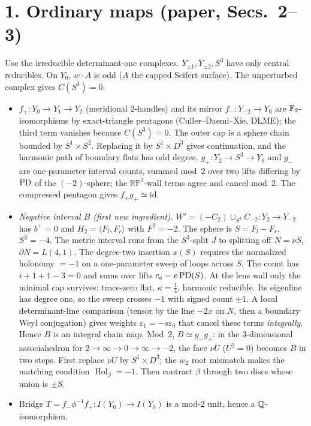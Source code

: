 \documentclass[10pt]{amsart}
\newcommand{\Hol}{\operatorname{Hol}}
\begin{document}
\section*{1. Ordinary maps (paper, Secs.~2--3)}
Use the irreducible determinant-one complexes. $Y_{\pm1},Y_{\pm2},S^3$ have
only central reducibles. On $Y_0$, $w\cdot A$ is odd ($A$ the capped Seifert
surface). The unperturbed complex gives $C(S^3)=0$.
\begin{itemize}
\item $f_+\colon Y_0\to Y_1\to Y_2$ (meridional $2$-handles) and its mirror
$f_-\colon Y_{-2}\to Y_0$ are $\mathbb F_2$-isomorphisms by exact-triangle
pentagons (Culler--Daemi--Xie, DLME); the third term vanishes because
$C(S^3)=0$. The outer cap is a sphere chain bounded by $S^1\times S^2$.
Replacing it by $S^1\times D^3$ gives continuation, and the harmonic path of
boundary flats has odd degree.
$g_+\colon Y_2\to S^3\to Y_0$ and $g_-$ are one-parameter interval counts,
summed mod~$2$ over two lifts differing by $\operatorname{PD}$ of the $(-2)$-sphere; the
$\mathbb{RP}^3$-wall terms agree and cancel mod~$2$. The compressed pentagon
gives $f_+g_+\simeq\mathrm{id}$.
\item \emph{Negative interval $B$ (first new ingredient).}
$W'=(-C_2)\cup_{S^3}C_{-2}\colon Y_2\to Y_{-2}$ has $b^+=0$ and
$H_2=\langle F_l,F_r\rangle$ with $F^2=-2$. The sphere is $S=F_l-F_r$, $S^2=-4$.
The metric interval runs from the $S^3$-split $J$ to splitting off
$N=\nu S$, $\partial N=L(4,1)$. The degree-two insertion $x(S)$ requires the
normalized holonomy $=-1$ on a one-parameter sweep of loops across $S$. The
count has $i+1+1-3=0$ and sums over lifts $c_e=e\operatorname{PD}(S)$. At the lens wall
only the minimal cap survives: trace-zero flat, $\kappa=\frac14$, harmonic
reducible. Its eigenline has degree one, so the sweep crosses $-1$ with
signed count $\pm1$. A local determinant-line comparison (tensor by the line
$-2x$ on $N$, then a boundary Weyl conjugation) gives weights
$\varepsilon_1=-s\varepsilon_0$ that cancel these terms \emph{integrally}.
Hence $B$ is an integral chain map. Mod~$2$, $B\simeq g_-g_+$: in the
$3$-dimensional associahedron for $2\to\infty\to0\to\infty\to-2$, the face
$\nu U$ ($U^2=0$) becomes $B$ in two steps. First replace $\nu U$ by
$S^1\times D^3$; the $w_2$ root mismatch makes the matching condition
$\Hol_\beta=-1$. Then contract $\beta$ through two discs whose union is
$\pm S$.
\item Bridge $T=f_-\phi^{-1}f_+\colon I(Y_0)\to I(Y_0)$ is a mod-$2$ unit,
hence a $\mathbb Q$-isomorphism.
\end{itemize}
\end{document}
